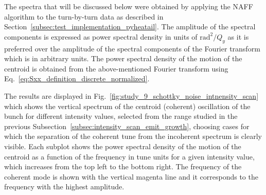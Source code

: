 The spectra that will be discussed below were obtained by applying the NAFF algorithm to the turn-by-turn data as described in Section~\ref{subsec:test_implementation_pyheatail}. The amplitude of the spectral components is expressed as power spectral density in units of $\mathrm{rad^2}/Q_y$ as it is preferred over the amplitude of the spectral components of the Fourier transform which is in arbitrary units. The power spectral density of the motion of the centroid is obtained from the above-mentioned Fourier transform using Eq.~\eqref{eq:Sxx_definition_discrete_normalized}.

The results are displayed in Fig.~\ref{fig:study_9_schottky_noise_intnensity_scan} which shows the vertical spectrum of the centroid (coherent) oscillation of the bunch for different intensity values, selected from the range studied in the previous Subsection~\ref{subsec:intensity_scan_emit_growth}, choosing cases for which the separation of the coherent tune from the incoherent spectrum is clearly visible. Each subplot shows the power spectral density of the motion of the centroid as a function of the frequency in tune units for a given intensity value, which increases from the top left to the bottom right. The frequency of the coherent mode is shown with the vertical magenta line and it corresponds to the frequency with the highest amplitude.

